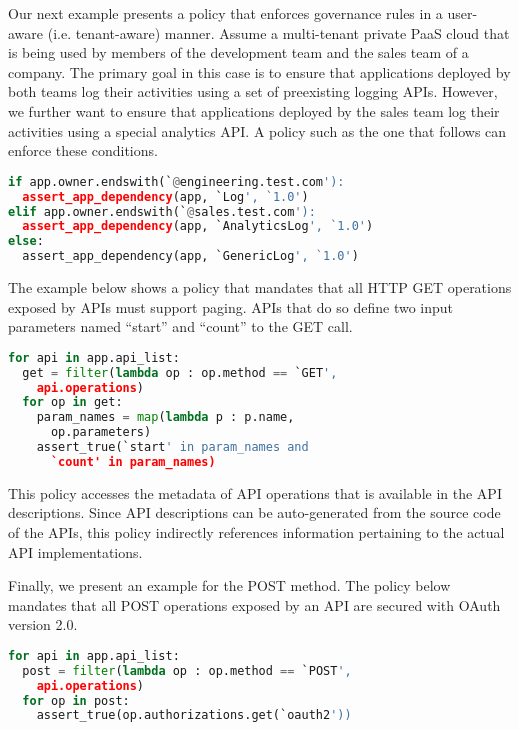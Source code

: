 Our next example presents a policy that enforces governance 
rules in a user-aware (i.e. tenant-aware) manner. Assume
a multi-tenant private PaaS cloud that is being 
used by members of the development
team and the sales team of a company. The primary goal in this case
is to ensure that applications deployed by both teams
log their activities using a set of preexisting logging APIs. 
However, we further want to ensure that applications
deployed by the sales team log their activities using 
a special analytics API. A policy such as the one
that follows can enforce these conditions.

\vspace{0.05in}
{\footnotesize
\begin{lstlisting}[language=Python, frame=single, showstringspaces=false]
if app.owner.endswith(`@engineering.test.com'):
  assert_app_dependency(app, `Log', `1.0')
elif app.owner.endswith(`@sales.test.com'):
  assert_app_dependency(app, `AnalyticsLog', `1.0')
else:
  assert_app_dependency(app, `GenericLog', `1.0')
\end{lstlisting}
}
\vspace{0.05in} 

The example below shows a policy that mandates 
that all HTTP GET operations exposed by APIs must support
paging. APIs that do so define two input parameters 
named ``start'' and ``count'' to the GET call.

\vspace{0.05in}
{\footnotesize
\begin{lstlisting}[language=Python, frame=single, showstringspaces=false]
for api in app.api_list:
  get = filter(lambda op : op.method == `GET',  
    api.operations)
  for op in get:
    param_names = map(lambda p : p.name, 
      op.parameters)
    assert_true(`start' in param_names and 
      `count' in param_names)
\end{lstlisting}
}
\vspace{0.05in}

This policy accesses the metadata of API operations that 
is available in the API descriptions.
Since API descriptions can be auto-generated 
from the source code of the APIs, this policy indirectly
references information pertaining to the actual API implementations.

Finally, we present an example for the POST method.  The 
policy below mandates 
that all POST operations exposed by an API are secured 
with OAuth version 2.0.

\vspace{0.05in}
{\footnotesize
\begin{lstlisting}[language=Python, frame=single, showstringspaces=false]
for api in app.api_list:
  post = filter(lambda op : op.method == `POST', 
  	api.operations)
  for op in post:
    assert_true(op.authorizations.get(`oauth2'))
\end{lstlisting}
}
\vspace{0.05in}

